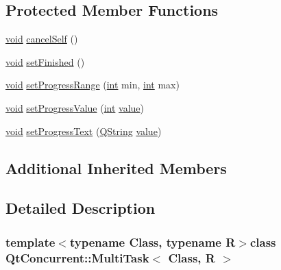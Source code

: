 \subsection*{Protected Member Functions}
\begin{DoxyCompactItemize}
\item 
\hyperlink{group___u_a_v_objects_plugin_ga444cf2ff3f0ecbe028adce838d373f5c}{void} \hyperlink{class_qt_concurrent_1_1_multi_task_a8a071abc42f1ade38f67272c2f984ed7}{cancel\-Self} ()
\item 
\hyperlink{group___u_a_v_objects_plugin_ga444cf2ff3f0ecbe028adce838d373f5c}{void} \hyperlink{class_qt_concurrent_1_1_multi_task_aa74507ce4e750dec0971bcb848cb1d91}{set\-Finished} ()
\item 
\hyperlink{group___u_a_v_objects_plugin_ga444cf2ff3f0ecbe028adce838d373f5c}{void} \hyperlink{class_qt_concurrent_1_1_multi_task_a91baa326d46ee44492bc21787e076274}{set\-Progress\-Range} (\hyperlink{ioapi_8h_a787fa3cf048117ba7123753c1e74fcd6}{int} min, \hyperlink{ioapi_8h_a787fa3cf048117ba7123753c1e74fcd6}{int} max)
\item 
\hyperlink{group___u_a_v_objects_plugin_ga444cf2ff3f0ecbe028adce838d373f5c}{void} \hyperlink{class_qt_concurrent_1_1_multi_task_a753f3c90016c76312a9ee8295b9c7f31}{set\-Progress\-Value} (\hyperlink{ioapi_8h_a787fa3cf048117ba7123753c1e74fcd6}{int} \hyperlink{glext_8h_aa0e2e9cea7f208d28acda0480144beb0}{value})
\item 
\hyperlink{group___u_a_v_objects_plugin_ga444cf2ff3f0ecbe028adce838d373f5c}{void} \hyperlink{class_qt_concurrent_1_1_multi_task_a0e1422726966b7d971b46836cff03dc1}{set\-Progress\-Text} (\hyperlink{group___u_a_v_objects_plugin_gab9d252f49c333c94a72f97ce3105a32d}{Q\-String} \hyperlink{glext_8h_aa0e2e9cea7f208d28acda0480144beb0}{value})
\end{DoxyCompactItemize}
\subsection*{Additional Inherited Members}


\subsection{Detailed Description}
\subsubsection*{template$<$typename Class, typename R$>$class Qt\-Concurrent\-::\-Multi\-Task$<$ Class, R $>$}



